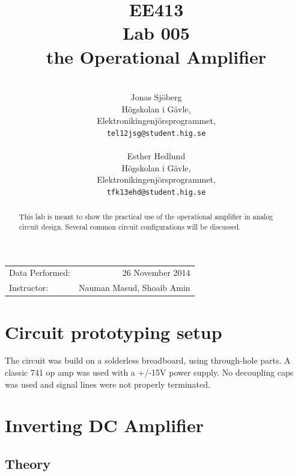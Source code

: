 \documentclass[11pt,a4paper]{article}
\title{EE413 \\ Lab 005 \\ the Operational Amplifier}
\author{\\
  Jonas Sjöberg\\
  Högskolan i Gävle,\\
  Elektronikingenjörsprogrammet,\\
  \texttt{tel12jsg@student.hig.se}\\
  \\
  Esther Hedlund\\
  Högskolan i Gävle,\\
  Elektronikingenjörsprogrammet,\\
  \texttt{tfk13ehd@student.hig.se}\\}
\date{}
\begin{document}
\maketitle

\begin{center}
\begin{tabular}{l r}
    Data Performed: & 26 November 2014 \\
    Instructor: & Nauman Masud, Shoaib Amin
\end{tabular}
\end{center}

\begin{abstract}
This lab is meant to show the practical use of the operational amplifier in
analog circuit design. Several common circuit configurations will be discussed.
\end{abstract}

\newpage

{
\setcounter{tocdepth}{3}
\tableofcontents
}

\newpage

\section{Circuit prototyping setup}\label{setup}
The circuit was build on a solderless breadboard, using through-hole parts.
A classic 741 op amp was used with a +/-15V power supply.
No decoupling caps was used and signal lines were not properly terminated.

\section{Inverting DC Amplifier}\label{inverting-dc-amplifier}

\subsection{Theory}\label{invDC-theory}
\end{document}
